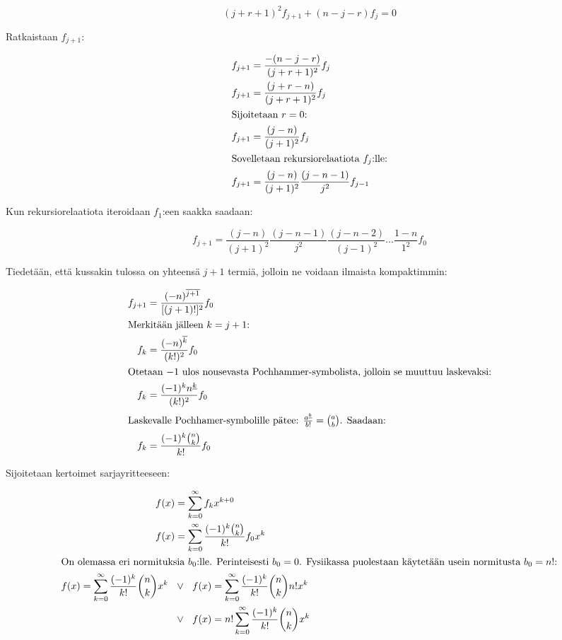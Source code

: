\documentclass[../johdoksia.tex]{subfiles}
\begin{document}
	\begin{equation*}
		(j + r + 1)^2f_{j + 1} + (n - j - r)f_j = 0
	\end{equation*}

	\noindent Ratkaistaan $f_{j + 1}$:
	
	\begin{align*}
		f_{j + 1} &= \frac{-(n - j - r)}{(j + r + 1)^2}f_j \\
		f_{j + 1} &= \frac{(j + r - n)}{(j + r + 1)^2}f_j \\
		\intertext{Sijoitetaan $r = 0$:}
		f_{j + 1} &= \frac{(j - n)}{(j + 1)^2}f_j \\
		\intertext{Sovelletaan rekursiorelaatiota $f_j$:lle:}
		f_{j + 1} &= \frac{(j - n)}{(j + 1)^2}\frac{(j - n - 1)}{j^2}f_{j - 1}
	\end{align*}

	\noindent Kun rekursiorelaatiota iteroidaan $f_1$:een saakka saadaan:
	
	\begin{equation*}
		f_{j + 1} = \frac{(j - n)}{(j + 1)^2}\frac{(j - n - 1)}{j^2}\frac{(j - n - 2)}{(j - 1)^2}\dots\frac{1 - n}{1^2}f_{0}
	\end{equation*}
	
	\noindent Tiedetään, että kussakin tulossa on yhteensä $j + 1$ termiä, jolloin ne voidaan ilmaista kompaktimmin:
	
	\begin{align*}
		f_{j + 1} &= \frac{(-n)^{\overline{j+1}}}{[(j + 1)!]^2}f_{0} \\
		\intertext{Merkitään jälleen $k = j + 1$:}
		f_{k} &= \frac{(-n)^{\overline{k}}}{(k!)^2}f_{0} \\
		\intertext{Otetaan $-1$ ulos nousevasta Pochhammer-symbolista, jolloin se muuttuu laskevaksi:}
		f_{k} &= \frac{(-1)^kn^{\underline{k}}}{(k!)^2}f_{0} \\
		\intertext{Laskevalle Pochhamer-symbolille pätee: $\frac{a^{\underline{b}}}{b!} = \binom{a}{b}$. Saadaan:}
		f_{k} &= \frac{(-1)^k\binom{n}{k}}{k!}f_{0} \\
	\end{align*}

	Sijoitetaan kertoimet sarjayritteeseen:
	
	\begin{align*}
		f(x) &= \sum_{k = 0}^{\infty}f_kx^{k + 0} \\
		f(x) &= \sum_{k = 0}^{\infty}\frac{(-1)^k\binom{n}{k}}{k!}f_{0}x^{k} \\
		\intertext{On olemassa eri normituksia $b_0$:lle. Perinteisesti $b_0 = 0$. Fysiikassa puolestaan käytetään usein normitusta $b_0 = n!$:}
		f(x) = \sum_{k = 0}^{\infty}\frac{(-1)^k}{k!}\binom{n}{k}x^{k} \ \ &\lor \ \ f(x) = \sum_{k = 0}^{\infty}\frac{(-1)^k}{k!}\binom{n}{k}n!x^{k} \\
		&\lor \ \ f(x) = n!\sum_{k = 0}^{\infty}\frac{(-1)^k}{k!}\binom{n}{k}x^{k} \\
	\end{align*}
\end{document}
